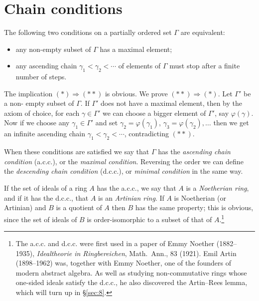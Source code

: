 \section{Chain conditions}\label{sec:3}

The following two conditions on a partially ordered set $\Gamma$ are
equivalent:
\begin{itemize}
  \item[(*)] any non-empty subset of $\Gamma$ has a maximal element;
  \item[(**)] any ascending chain $\gamma_1 < \gamma_2 < \cdots$ of elements of $\Gamma$ must stop after a
        finite number of steps.
\end{itemize}
The implication $(*) \Rightarrow (**)$ is obvious. We prove $(**) \Rightarrow (*)$. Let $\Gamma'$ be a non-
empty subset of $\Gamma$. If $\Gamma'$ does not have a maximal element, then by the axiom
of choice, for each $\gamma \in \Gamma'$ we can choose a bigger element of $\Gamma'$, say $\varphi(\gamma)$. Now if
we choose any $\gamma_1 \in \Gamma'$ and set $\gamma_2 = \varphi(\gamma_1)$, $\gamma_3 = \varphi(\gamma_2), \ldots$ then we get an infinite
ascending chain $\gamma_1 < \gamma_2 < \cdots$, contradicting $(**)$.

When these conditions are satisfied we say that $\Gamma$ has the \emph{ascending chain
condition} (a.c.c.), or the \emph{maximal condition}. Reversing the order we can define
the \emph{descending chain condition} (d.c.c.), or \emph{minimal condition} in the same way.

If the set of ideals of a ring $A$ has the a.c.c., we say that $A$ is a \emph{Noetherian
ring}, and if it has the d.c.c., that $A$ is an \emph{Artinian ring}. If $A$ is Noetherian (or
Artinian) and $B$ is a quotient of $A$ then $B$ has the same property; this is
obvious, since the set of ideals of $B$ is order-isomorphic to a subset of
that of $A$.\footnote{The a.c.c. and d.c.c. were first used in a paper of Emmy Noether (1882--1935), \textit{Idealtheorie in Ringbereichen}, Math.\ Ann., 83 (1921). Emil Artin (1898--1962) was, together with Emmy Noether, one of the founders of modern abstract algebra. As well as studying non-commutative rings whose one-sided ideals satisfy the d.c.c., he also discovered the Artin--Rees lemma, which will turn up in \S\ref{sec:8}.}

